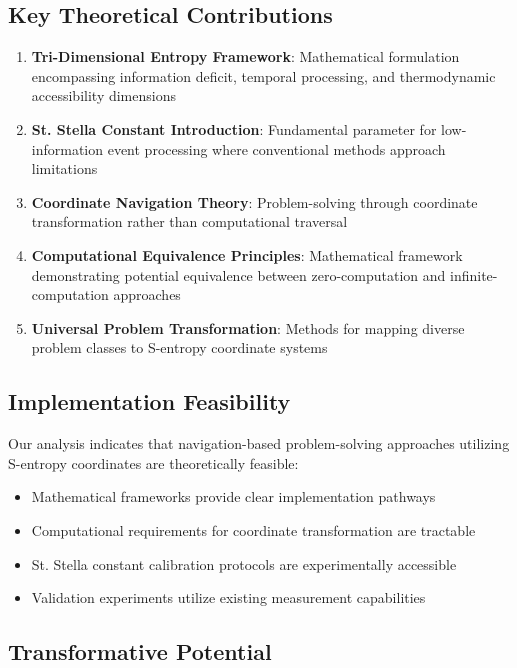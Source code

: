 \documentclass[11pt]{article}
\begin{document}
\subsection{Key Theoretical Contributions}

\begin{enumerate}
\item \textbf{Tri-Dimensional Entropy Framework}: Mathematical formulation encompassing information deficit, temporal processing, and thermodynamic accessibility dimensions
\item \textbf{St. Stella Constant Introduction}: Fundamental parameter for low-information event processing where conventional methods approach limitations
\item \textbf{Coordinate Navigation Theory}: Problem-solving through coordinate transformation rather than computational traversal
\item \textbf{Computational Equivalence Principles}: Mathematical framework demonstrating potential equivalence between zero-computation and infinite-computation approaches
\item \textbf{Universal Problem Transformation}: Methods for mapping diverse problem classes to S-entropy coordinate systems
\end{enumerate}

\subsection{Implementation Feasibility}

Our analysis indicates that navigation-based problem-solving approaches utilizing S-entropy coordinates are theoretically feasible:

\begin{itemize}
\item Mathematical frameworks provide clear implementation pathways
\item Computational requirements for coordinate transformation are tractable
\item St. Stella constant calibration protocols are experimentally accessible
\item Validation experiments utilize existing measurement capabilities
\end{itemize}

\subsection{Transformative Potential}
\end{document}
